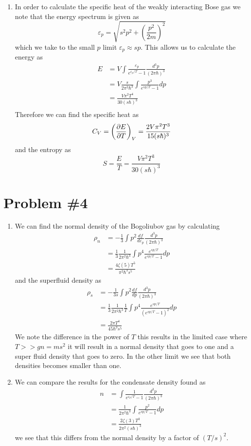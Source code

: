 \documentclass[11pt]{article}
\numberwithin{equation}{section}
\begin{document}
\begin{enumerate}[(1)]
\item In order to calculate the specific heat of the weakly interacting Bose gas we note 
that the energy spectrum is given as
$$\varepsilon_p = \sqrt{s^2p^2+\left(\frac{p^2}{2m}\right)^2}$$
which we take to the small $p$ limit $\varepsilon_p\approx sp$. This allows us to calculate 
the energy as
\begin{align*}
E &= V\int\frac{\varepsilon_p}{e^{\varepsilon_p/T}-1}\frac{d^3p}{(2\pi\hbar)^3}\\
&= V\frac{s}{2\pi^2\hbar^3}\int\frac{p^3}{e^{sp/T}-1}dp\\
&= \frac{V\pi^2T^4}{30(s\hbar)^3}\\
\end{align*}
Therefore we can find the specific heat as
$$C_V = \left(\frac{\partial{E}}{\partial{T}}\right)_{V} = \frac{2V\pi^2T^3}{15(s\hbar)^3}$$
and the entropy as
$$S = \frac{E}{T} = \frac{V\pi^2T^3}{30(s\hbar)^3}$$
\end{enumerate}

\pagebreak

\section{Problem \#4}
\begin{enumerate}[(1)]
\item We can find the normal density of the Bogoliubov gas by calculating 
\begin{align*}
\rho_n &= -\frac{1}{3}\int p^2\frac{df}{d\varepsilon_p}\frac{d^3p}{(2\pi\hbar)^3}\\
&= \frac{1}{3}\frac{1}{2\pi^2\hbar^3}\int p^4\frac{e^{sp/T}}{e^{sp/T}-1}dp\\
&= \frac{4\zeta(5)T^5}{\pi^2\hbar^3s^5}
\end{align*}
and the superfluid density as
\begin{align*}
\rho_s &= -\frac{1}{3s}\int p^2\frac{df}{dp}\frac{d^3p}{(2\pi\hbar)^3}\\
&= \frac{1}{3}\frac{1}{2\pi^2\hbar^3}\frac{1}{T}\int p^4\frac{e^{sp/T}}{(e^{sp/T}-1)^2}dp\\
&= \frac{2\pi{T^4}}{45\hbar^3s^5}
\end{align*}
We note the difference in the power of $T$ this results in the limited case where $T>>gn=ms^2$ 
it will result in a normal density that goes to one and a super fluid density that goes to
zero. In the other limit we see that both densities becomes smaller than one.

\item We can compare the results for the condensate density found as
\begin{align*}
n &= \int\frac{1}{e^{\varepsilon_p/T}-1}\frac{d^3p}{(2\pi\hbar)^3}\\
&= \frac{1}{2\pi^2\hbar^3}\int\frac{p^2}{e^{sp/T}-1}dp\\
&= \frac{2\zeta(3)T^3}{2\pi^2(s\hbar)^3}
\end{align*}
we see that this differs from the normal density by a factor of $(T/s)^2$.



\end{enumerate}
\end{document}
